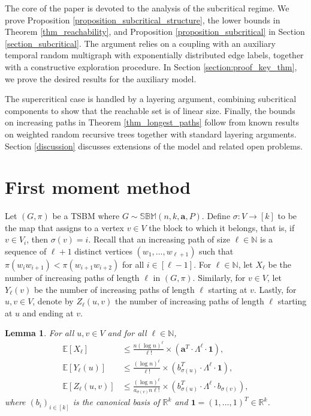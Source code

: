 \documentclass[11pt]{article}
\numberwithin{equation}{section}
\newtheorem{lemma}[theorem]{Lemma}
\theoremstyle{definition}
\newcommand\bB{{\mathbb B}}
\newcommand\bE{{\mathbb E}}
\newcommand\bM{{\mathbb M}}
\newcommand\bN{{\mathbb N}}
\newcommand\bS{{\mathbb S}}
\begin{document}
The core of the paper is devoted to the analysis of the subcritical regime. We prove Proposition \ref{proposition_subcritical_structure}, the lower bounds in Theorem \ref{thm_reachability}, and Proposition \ref{proposition_subcritical} in Section \ref{section_subcritical}. 
The argument relies on a coupling with an auxiliary temporal random multigraph with exponentially distributed edge labels, together with a constructive exploration procedure. In Section \ref{section:proof_key_thm}, we prove the desired results for the auxiliary model.

The supercritical case is handled by a layering argument, combining subcritical components to show that the reachable set is of linear size.
Finally, the bounds on increasing paths in Theorem \ref{thm_longest_paths} follow from known results on weighted random recursive trees together with standard layering arguments. Section \ref{discussion} discusses extensions of the model and related open problems.


\section{First moment method}
\label{section_first_moments}

Let $(G,\pi)$ be a TSBM where $G \sim \bS\bB\bM(n,k,\boldsymbol{a},P)$. Define $\sigma : V \to [k]$ to be the map that assigns to a vertex $v \in V$ the block to which it belongs, that is, if $v\in V_i$, then $\sigma(v)=i$. Recall that an increasing path of size $\ell \in \bN$ is a sequence of $\ell+1$ distinct vertices $(w_1,\ldots,w_{\ell+1})$ such that $\pi(w_iw_{i+1}) < \pi(w_{i+1}w_{i+2})$ for all $i \in [\ell-1]$. For $\ell \in \bN$, let $X_\ell$ be the number of increasing paths of length $\ell$ in $(G,\pi)$. Similarly, for $v\in V$, let $Y_\ell(v)$ be the number of increasing paths of length $\ell$ starting at $v$. Lastly, for $u,v  \in V$, denote by $Z_\ell(u,v)$ the number of increasing paths of length $\ell$ starting at $u$ and ending at $v$. 

\begin{lemma}
\label{lemma:nb_paths}
For all $u,v \in V$ and for all $\ell \in \bN$,
\begin{equation*}
\begin{split}
\bE[X_\ell] &\leq  \frac{n (\log n)^\ell }{\ell!} \times (\boldsymbol{a}^T \cdot \Lambda^\ell \cdot \boldsymbol{1}), \\
\bE[Y_\ell(u)] &\leq \frac{(\log n)^\ell }{\ell!} \times (b_{\sigma(u)}^T \cdot \Lambda^\ell \cdot \boldsymbol{1}),\\
\bE[Z_\ell(u,v)] &\leq \frac{(\log n)^\ell }{a_{\sigma(v)}n\ell!} \times (b_{\sigma(u)}^T \cdot \Lambda^\ell \cdot b_{\sigma(v)}),
\end{split}
\end{equation*}
where $(b_i)_{i \in [k]}$ is the canonical basis of $\mathbb{R}^k$ and $\boldsymbol{1} = (1,\ldots,1)^T \in \mathbb{R}^k$. 
\end{lemma}
\end{document}
